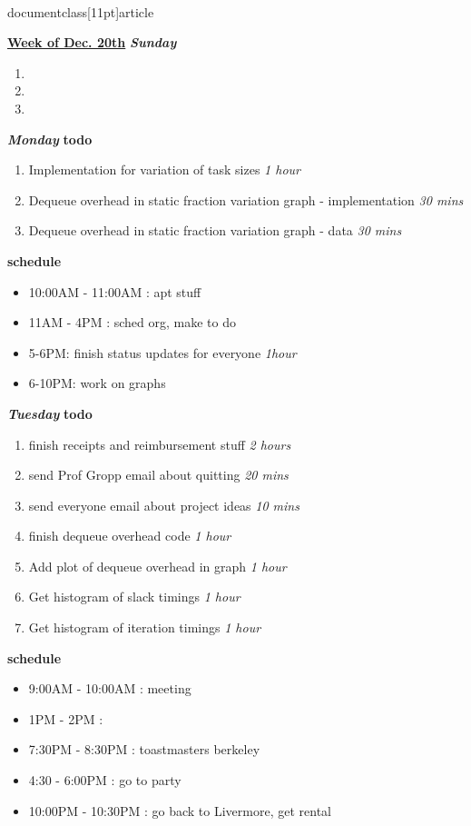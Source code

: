 \\documentclass[11pt]{article}
\newcommand{\timeEst}[1]{\textit{#1}}
\begin{document}
\underline{\textbf{Week of Dec. 20th}}
\textbf{\textit{Sunday}}
\begin{enumerate}
\item
\item
\item
\end{enumerate}

\textbf{\textit{Monday}}
\textbf{todo}
\begin{enumerate}
\item Implementation for variation of task sizes \timeEst{1 hour}
\item Dequeue overhead in static fraction variation graph - implementation \timeEst{30 mins}
\item Dequeue overhead in static fraction variation graph - data \timeEst{30 mins}
\end{enumerate}

\textbf{schedule}
\begin{itemize}
\item 10:00AM - 11:00AM : apt stuff
\item 11AM - 4PM : sched org, make to do
\item 5-6PM: finish status updates for everyone \timeEst { 1hour}
\item 6-10PM: work on graphs
\end{itemize}
\textbf{\textit{Tuesday}}
\textbf{todo}
\begin{enumerate}
\item finish receipts and reimbursement stuff \timeEst{2 hours}
\item send Prof Gropp email about quitting \timeEst{20 mins}
\item send everyone email about project ideas \timeEst {10 mins}
\item finish dequeue overhead code \timeEst{1 hour}
\item Add plot of dequeue overhead in graph \timeEst{1 hour}
\item Get histogram of slack timings \timeEst{1 hour}
\item Get histogram of iteration timings \timeEst{ 1 hour}
\end{enumerate}

\textbf{schedule}
\begin{itemize}
\item 9:00AM - 10:00AM : meeting
\item 1PM - 2PM :
\item 7:30PM - 8:30PM : toastmasters berkeley
\item 4:30 - 6:00PM :  go to party
\item 10:00PM - 10:30PM : go back to Livermore, get rental
\end{itemize}
\end{document}
